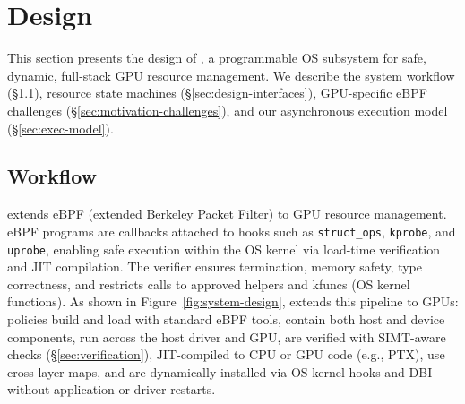 \section{\sys Design}


This section presents the design of \sys{}, a programmable OS subsystem for safe, dynamic, full-stack GPU resource management.
We describe the system workflow (\S\ref{sec:workflow}), resource state machines (\S\ref{sec:design-interfaces}), GPU-specific eBPF challenges (\S\ref{sec:motivation-challenges}), and our asynchronous execution model (\S\ref{sec:exec-model}).

\subsection{\sys{} Workflow}
\label{sec:workflow}

\sys{} extends eBPF (extended Berkeley Packet Filter) to GPU resource management.
eBPF programs are callbacks attached to hooks such as \texttt{struct\_ops}, \texttt{kprobe}, and \texttt{uprobe}, enabling safe execution within the OS kernel via load-time verification and JIT compilation.
The verifier ensures termination, memory safety, type correctness, and restricts calls to approved helpers and kfuncs (OS kernel functions).
As shown in Figure~\ref{fig:system-design}, \sys{} extends this pipeline to GPUs: policies build and load with standard eBPF tools, contain both host and device components, run across the host driver and GPU, are verified with SIMT-aware checks (\S\ref{sec:verification}), JIT-compiled to CPU or GPU code (e.g., PTX), use cross-layer maps, and are dynamically installed via OS kernel hooks and DBI without application or driver restarts.

